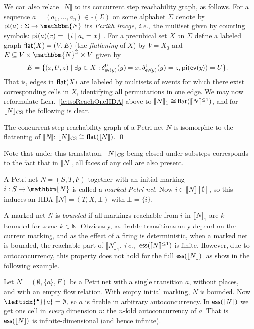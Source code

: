 \documentclass[runningheads,envcountsame]{llncs}
\newcommand*\ie{\textit{i.e.},}
\newcommand*\ev{\textup{\textsf{ev}}}
\newcommand*\Nat{\mathbbm{N}}
\newcommand*\ess{\textup{\textsf{ess}}}
\newcommand*\prepla[1]{\leftidx{^\bullet}{#1}}
\newcommand*\sem[1]{\llbracket #1\rrbracket}
\newcommand*\flatten{\textup{\textsf{flat}}}
\begin{document}
We can also relate $\sem{N}$ to its concurrent step reachability graph, as follows.
For a sequence $a=(a_1,\dots, a_n)\in \square(\Sigma)$ on some alphabet $\Sigma$
denote by $\textup{pi}(a): \Sigma\to \Nat$ its \emph{Parikh image},
\ie~the multiset given by counting symbols: $\textup{pi}(a)(x)=|\{i\mid a_i=x\}|$.
For a precubical set $X$ on $\Sigma$ define a labeled graph $\flatten(X)=(V, E)$
(the \emph{flattening} of $X$) by $V=X_0$ and $E\subseteq V\times \Nat^\Sigma\times V$ given by
\begin{equation*}
  E = \{(x, U, z)\mid \exists y\in X:
  \delta_{\ev(y)}^0(y)=x, \delta_{\ev(y)}^1(y)=z, \textup{pi}(\ev(y))=U\}.
\end{equation*}
That is, edges in $\flatten(X)$ are labeled by multisets of events for which there exist corresponding cells in $X$,
identifying all permutations in one edge.
We may now reformulate Lem.~\ref{le:isoReachOneHDA} above to $\sem{N}_1\cong \flatten(\sem{N}^{\le 1})$,
and for $\sem{N}_{\textup{CS}}$ the following is clear.

\begin{lemma}
  \label{le:isoCReachHDA}
  The concurrent step reachability graph of a Petri net $N$
  is isomorphic to the flattening of $\sem{N}$:
  $\sem{N}_{\textup{CS}}\cong \flatten(\sem{N})$. \qed
\end{lemma}

Note that under this translation, $\sem{N}_{\textup{CS}}$ being closed under substeps
corresponds to the fact that in $\sem{N}$, all faces of any cell are also present.

A Petri net $N=(S, T, F)$ together with an initial marking $i: S\to \Nat$ is called a \emph{marked Petri net}.
Now $i\in \sem{N}[\emptyset]$,
so this induces an HDA $\sem{N}=(T, X, \bot)$ with $\bot=\{i\}$.

A marked net $N$ is \emph{bounded} if all markings reachable from $i$ in $\sem{N}_1$ are $k-$bounded for some $k\in \mathbb N$.
Obviously, as firable transitions only depend on the current marking, and as the effect of a firing is deterministic, when a marked net is bounded, the reachable part of $\sem{N}_1$, \ie~$\ess(\sem{N}^{\le 1})$ is finite.
However, due to autoconcurrency, this property does not hold for the full $\ess(\sem{N})$, as show in the following example.

\begin{example}
  Let $N=(\emptyset, \{a\}, F)$ be a Petri net with a single transition $a$,
  without places, and with an empty flow relation.
  With empty initial marking, $N$ is bounded.
  Now $\prepla{a}=\emptyset$, so $a$ is firable in arbitrary autoconcurrency.
  In $\ess(\sem{N})$ we get one cell in \emph{every} dimension $n$: the $n$-fold autoconcurrency of $a$.
  That is, $\ess(\sem{N})$ is infinite-dimensional (and hence infinite).
\end{example}
\end{document}
